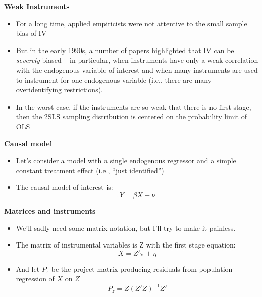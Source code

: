 \documentclass[notes=show]{beamer}
\begin{document}
\begin{frame}[plain]

	\begin{center}
	\textbf{Weak Instruments}
	\end{center}
	
	\begin{itemize}
	\item For a long time, applied empiricists were not attentive to the small sample bias of IV
	\item But in the early 1990s, a number of papers highlighted that IV can be \emph{severely} biased -- in particular, when instruments have only a weak correlation with the endogenous variable of interest and when many instruments are used to instrument for one endogenous variable (i.e., there are many overidentifying restrictions).
	\item In the worst case, if the instruments are so weak that there is no first stage, then the 2SLS sampling distribution is centered on the probability limit of OLS
	\end{itemize}
\end{frame}

\begin{frame}[plain]

	\begin{center}
	\textbf{Causal model}
	\end{center}
	
	\begin{itemize}
	\item Let's consider a model with a single endogenous regressor and a simple constant treatment effect (i.e., ``just identified'')
	\item The causal model of interest is: $$Y=\beta X + \nu$$
	\end{itemize}
\end{frame}


\begin{frame}[plain]
\begin{center}
\textbf{Matrices and instruments}
\end{center}

\begin{itemize}
	\item We'll sadly need some matrix notation, but I'll try to make it painless.
	\item The matrix of instrumental variables is Z with the first stage equation:$$X = {Z'}\pi + \eta$$
	\item And let $P_z$ be the project matrix producing residuals from population regression of $X$ on $Z$ $$P_z=Z(Z'Z)^{-1}Z'$$
\end{itemize}

\end{frame}
\end{document}
